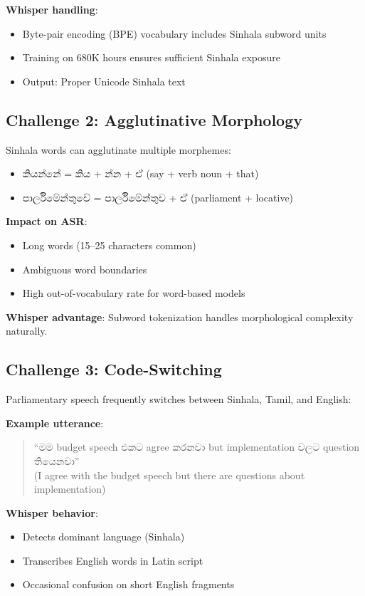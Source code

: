 \documentclass[11pt,a4paper]{article}
\begin{document}
\textbf{Whisper handling}:
\begin{itemize}
    \item Byte-pair encoding (BPE) vocabulary includes Sinhala subword units
    \item Training on 680K hours ensures sufficient Sinhala exposure
    \item Output: Proper Unicode Sinhala text
\end{itemize}

\subsection{Challenge 2: Agglutinative Morphology}

Sinhala words can agglutinate multiple morphemes:

\begin{itemize}
    \item කියන්නේ = කිය + න්න + ඒ (say + verb noun + that)
    \item පාර්ලිමේන්තුවේ = පාර්ලිමේන්තුව + ඒ (parliament + locative)
\end{itemize}

\textbf{Impact on ASR}:
\begin{itemize}
    \item Long words (15--25 characters common)
    \item Ambiguous word boundaries
    \item High out-of-vocabulary rate for word-based models
\end{itemize}

\textbf{Whisper advantage}: Subword tokenization handles morphological complexity naturally.

\subsection{Challenge 3: Code-Switching}

Parliamentary speech frequently switches between Sinhala, Tamil, and English:

\textbf{Example utterance}:
\begin{quote}
``මම budget speech එකට agree කරනවා but implementation වලට question තියෙනවා''\\
(I agree with the budget speech but there are questions about implementation)
\end{quote}

\textbf{Whisper behavior}:
\begin{itemize}
    \item Detects dominant language (Sinhala)
    \item Transcribes English words in Latin script
    \item Occasional confusion on short English fragments
\end{itemize}
\end{document}
